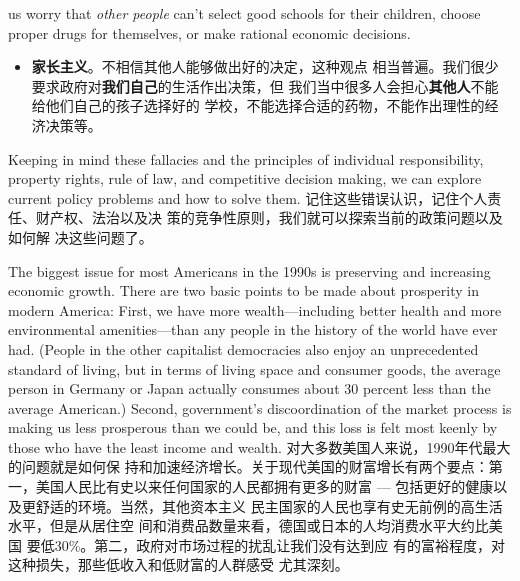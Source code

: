 \begin{paracol}{2}
\begin{itemize}
	us worry that \textit{other people} can't select good schools for their
	children, choose proper drugs for themselves, or make rational economic decisions.
\end{itemize}
\switchcolumn
\begin{itemize}
	\item \textbf{家长主义}。不相信其他人能够做出好的决定，这种观点
	相当普遍。我们很少要求政府对\textbf{我们自己}的生活作出决策，但
	我们当中很多人会担心\textbf{其他人}不能给他们自己的孩子选择好的
	学校，不能选择合适的药物，不能作出理性的经济决策等。
\end{itemize}
\switchcolumn*
Keeping in mind these fallacies and the principles of individual responsibility, property rights, rule of law, and competitive
decision making, we can explore current policy problems and
how to solve them.
\switchcolumn
记住这些错误认识，记住个人责任、财产权、法治以及决
策的竞争性原则，我们就可以探索当前的政策问题以及如何解
决这些问题了。


The biggest issue for most Americans in the 1990s is preserving
and increasing economic growth. There are two basic points to
be made about prosperity in modern America: First, we have
more wealth---including better health and more environmental
amenities---than any people in the history of the world have
ever had. (People in the other capitalist democracies also enjoy
an unprecedented standard of living, but in terms of living
space and consumer goods, the average person in Germany or
Japan actually consumes about 30 percent less than the average
American.) Second, government's discoordination of the market process is making us less prosperous than we could be, and this loss is felt most keenly by those who have the least income and wealth.
\switchcolumn
对大多数美国人来说，1990年代最大的问题就是如何保
持和加速经济增长。关于现代美国的财富增长有两个要点：第一，美国人民比有史以来任何国家的人民都拥有更多的财富
--- 包括更好的健康以及更舒适的环境。当然，其他资本主义
民主国家的人民也享有史无前例的高生活水平，但是从居住空
间和消费品数量来看，德国或日本的人均消费水平大约比美国
要低30\%。第二，政府对市场过程的扰乱让我们没有达到应
有的富裕程度，对这种损失，那些低收入和低财富的人群感受
尤其深刻。


\end{paracol}
